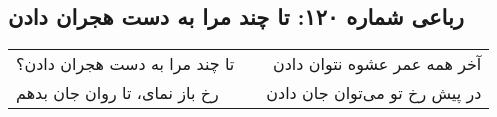 \begin{center}
\section*{رباعی شماره ۱۲۰: تا چند مرا به دست هجران دادن}
\label{sec:120}
\begin{longtable}{l p{0.5cm} r}
تا چند مرا به دست هجران دادن؟
&&
آخر همه عمر عشوه نتوان دادن
\\
رخ باز نمای، تا روان جان بدهم
&&
در پیش رخ تو می‌توان جان دادن
\\
\end{longtable}
\end{center}
